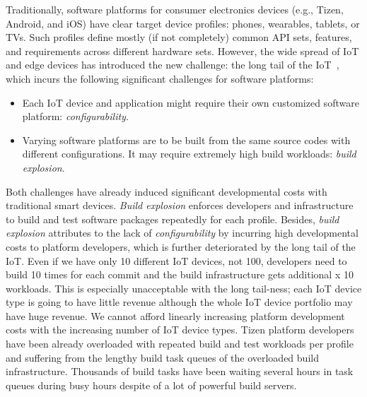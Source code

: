 Traditionally, software platforms for consumer electronics devices (e.g., Tizen, Android, and iOS) have clear target device profiles: phones, wearables, tablets, or TVs.
Such profiles define mostly (if not completely) common API sets, features, and requirements across different hardware sets.
However, the wide spread of IoT and edge devices has introduced the new challenge: the long tail of the IoT~\cite{1Want2015EnablingTI}, which incurs the following significant challenges for software platforms:
\begin{itemize}
\item Each IoT device and application might require their own customized software platform: \textit{configurability}.
\item Varying software platforms are to be built from the same source codes with different configurations. It may require extremely high build workloads: \textit{build explosion}.
\end{itemize}

Both challenges have already induced significant developmental costs with traditional smart devices.
\textit{Build explosion} enforces developers and infrastructure to build and test software packages repeatedly for each profile.
Besides, \textit{build explosion} attributes to the lack of \textit{configurability} by incurring high developmental costs to platform developers, which is further deteriorated by the long tail of the IoT.
Even if we have only 10 different IoT devices, not 100, developers need to build 10 times for each commit and the build infrastructure gets additional x 10 workloads.
This is especially unacceptable with the long tail-ness; each IoT device type is going to have little revenue although the whole IoT device portfolio may have huge revenue.
We cannot afford linearly increasing platform development costs with the increasing number of IoT device types.
Tizen platform developers have been already overloaded with repeated build and test workloads per profile and suffering from the lengthy build task queues of the overloaded build infrastructure.
Thousands of build tasks have been waiting several hours in task queues during busy hours despite of a lot of powerful build servers.

